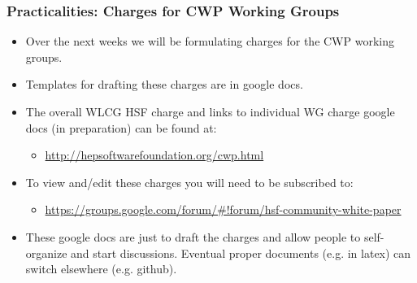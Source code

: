 \begin{frame}
\frametitle{Practicalities: Charges for CWP Working Groups}


\begin{itemize} 
\item Over the next weeks we will be formulating charges for the CWP working groups.
\item Templates for drafting these charges are in google docs.
\item The overall WLCG HSF charge and links to individual WG charge google docs (in preparation) can be found at:
   \begin{itemize}
   \item {\color{blue} \url{http://hepsoftwarefoundation.org/cwp.html}}
   \end{itemize}
\item To view and/edit these charges you will need to be subscribed to:
   \begin{itemize}
   \item {\color{blue} \url{https://groups.google.com/forum/\#!forum/hsf-community-white-paper}}
   \end{itemize}
\item These google docs are just to draft the charges and allow people to self-organize and start discussions. Eventual proper documents (e.g. in latex) can switch elsewhere (e.g. github).
\end{itemize} 

\end{frame}


